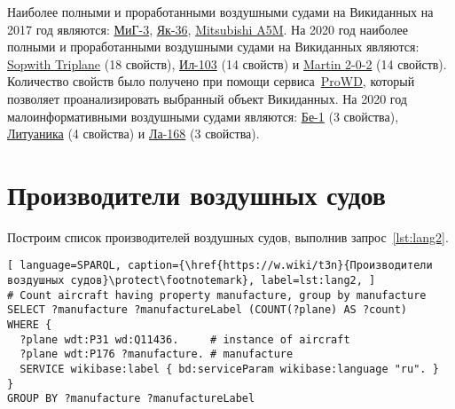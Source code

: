 
Наиболее полными и проработанными воздушными судами на Викиданных на 2017 год являются: \href{https://www.wikidata.org/wiki/Q271446}{МиГ-3}, \href{https://www.wikidata.org/wiki/Q1349098}{Як-36}, \href{https://www.wikidata.org/wiki/Q429839}{Mitsubishi A5M}. На 2020 год наиболее полными и проработанными воздушными судами на Викиданных являются: \href{https://www.wikidata.org/wiki/Q770863}{Sopwith Triplane} (18 свойств), \href{https://www.wikidata.org/wiki/Q1658673}{Ил-103} (14 свойств) и \href{https://www.wikidata.org/wiki/Q665071}{Martin 2-0-2} (14 свойств).
Количество свойств было получено 
при помощи сервиса~\href{https://prowd.id/dashboards/972cd00ce110/profile}{ProWD}\autocite{aircraft_prowd}, 
который позволяет проанализировать выбранный объект Викиданных.
На 2020 год малоинформативными воздушными судами являются: \href{https://www.wikidata.org/wiki/Q820603}{Бе-1} (3 свойства), \href{https://www.wikidata.org/wiki/Q117984}{Литуаника} (4 свойства) и \href{https://www.wikidata.org/wiki/Q572762}{Ла-168} (3 свойства).

\section{Производители воздушных судов}

Построим список производителей воздушных судов, выполнив запрос~\ref{lst:lang2}.

\begin{lstlisting}[ language=SPARQL, caption={\href{https://w.wiki/t3n}{Производители воздушных судов}\protect\footnotemark}, label=lst:lang2, ]
# Count aircraft having property manufacture, group by manufacture
SELECT ?manufacture ?manufactureLabel (COUNT(?plane) AS ?count) 
WHERE {
  ?plane wdt:P31 wd:Q11436.     # instance of aircraft
  ?plane wdt:P176 ?manufacture. # manufacture
  SERVICE wikibase:label { bd:serviceParam wikibase:language "ru". }
}
GROUP BY ?manufacture ?manufactureLabel
\end{lstlisting}

